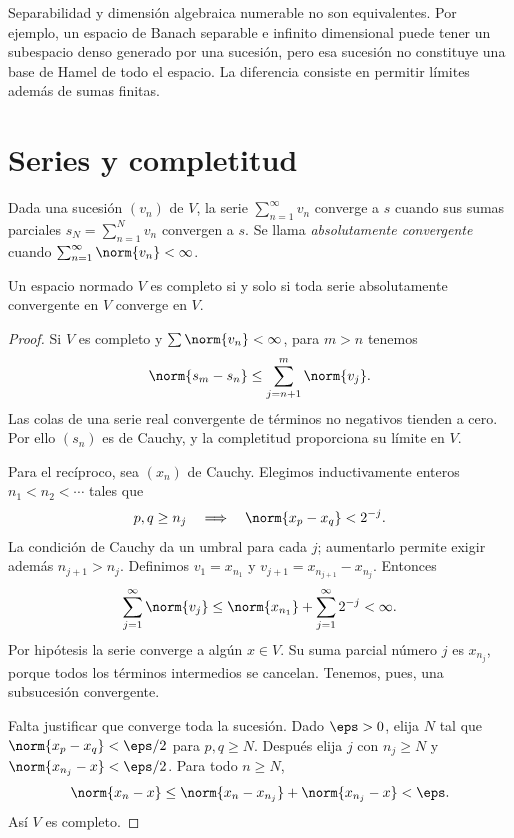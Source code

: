 \begin{observacion}
Separabilidad y dimensión algebraica numerable no son equivalentes. Por ejemplo, un espacio de Banach separable e infinito dimensional puede tener un subespacio denso generado por una sucesión, pero esa sucesión no constituye una base de Hamel de todo el espacio. La diferencia consiste en permitir límites además de sumas finitas.
\end{observacion}

\section{Series y completitud}

\begin{definicion}
Dada una sucesión $(v_n)$ de $V$, la serie $\sum_{n=1}^{\infty}v_n$ converge a $s$ cuando sus sumas parciales $s_N=\sum_{n=1}^N v_n$ convergen a $s$. Se llama \emph{absolutamente convergente} cuando $\sum_{n=1}^{\infty}\norm{v_n}<\infty$.
\end{definicion}

\begin{teorema}\label{ch19:series}
Un espacio normado $V$ es completo si y solo si toda serie absolutamente convergente en $V$ converge en $V$.
\end{teorema}
\begin{proof}
Si $V$ es completo y $\sum\norm{v_n}<\infty$, para $m>n$ tenemos
\[
 \norm{s_m-s_n}\leq\sum_{j=n+1}^m\norm{v_j}.
\]
Las colas de una serie real convergente de términos no negativos tienden a cero. Por ello $(s_n)$ es de Cauchy, y la completitud proporciona su límite en $V$.

Para el recíproco, sea $(x_n)$ de Cauchy. Elegimos inductivamente enteros $n_1<n_2<\cdots$ tales que
\[
 p,q\geq n_j\quad\Longrightarrow\quad\norm{x_p-x_q}<2^{-j}.
\]
La condición de Cauchy da un umbral para cada $j$; aumentarlo permite exigir además $n_{j+1}>n_j$. Definimos $v_1=x_{n_1}$ y $v_{j+1}=x_{n_{j+1}}-x_{n_j}$. Entonces
\[
 \sum_{j=1}^{\infty}\norm{v_j}
 \leq\norm{x_{n_1}}+\sum_{j=1}^{\infty}2^{-j}<\infty.
\]
Por hipótesis la serie converge a algún $x\in V$. Su suma parcial número $j$ es $x_{n_j}$, porque todos los términos intermedios se cancelan. Tenemos, pues, una subsucesión convergente.

Falta justificar que converge toda la sucesión. Dado $\eps>0$, elija $N$ tal que $\norm{x_p-x_q}<\eps/2$ para $p,q\geq N$. Después elija $j$ con $n_j\geq N$ y $\norm{x_{n_j}-x}<\eps/2$. Para todo $n\geq N$,
\[
 \norm{x_n-x}\leq\norm{x_n-x_{n_j}}+\norm{x_{n_j}-x}<\eps.
\]
Así $V$ es completo.
\end{proof}

